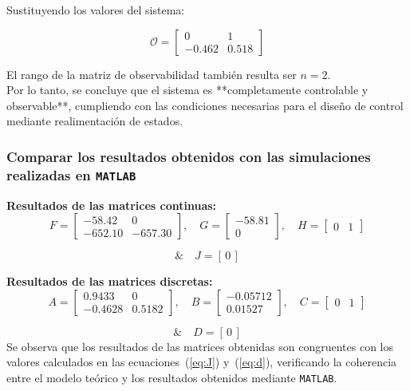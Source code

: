 Sustituyendo los valores del sistema:

\[
\mathcal{O} =
\begin{bmatrix}
	0 & 1 \\[4pt]
	-0.462 & 0.518
\end{bmatrix}
\]

El rango de la matriz de observabilidad también resulta ser $n = 2$.\\  
Por lo tanto, se concluye que el sistema es **completamente controlable y observable**, cumpliendo con las condiciones necesarias para el diseño de control mediante realimentación de estados.

\subsubsection{Comparar los resultados obtenidos con las simulaciones realizadas en \texttt{MATLAB}}
\textbf{Resultados de las matrices continuas:}
\[
F =
\begin{bmatrix}
	-58.42 & 0 \\[4pt]
	-652.10 & -657.30
\end{bmatrix}, \quad
G =
\begin{bmatrix}
	-58.81 \\[4pt]
	0
\end{bmatrix}, \quad
H =
\begin{bmatrix}
	0 & 1
\end{bmatrix}
\]

\[
	\& \quad
	J = [\,0\,]
\]

\textbf{Resultados de las matrices discretas:}
\[
A =
\begin{bmatrix}
	0.9433 & 0 \\[4pt]
	-0.4628 & 0.5182
\end{bmatrix}, \quad
B =
\begin{bmatrix}
	-0.05712 \\[4pt]
	0.01527
\end{bmatrix}, \quad
C =
\begin{bmatrix}
	0 & 1
\end{bmatrix}
\]

\[
	\& \quad
	D = [\,0\,]
\]
Se observa que los resultados de las matrices obtenidas son congruentes con los valores calculados en las ecuaciones~(\ref{eq:J}) y~(\ref{eq:d}), verificando la coherencia entre el modelo teórico y los resultados obtenidos mediante \texttt{MATLAB}.
